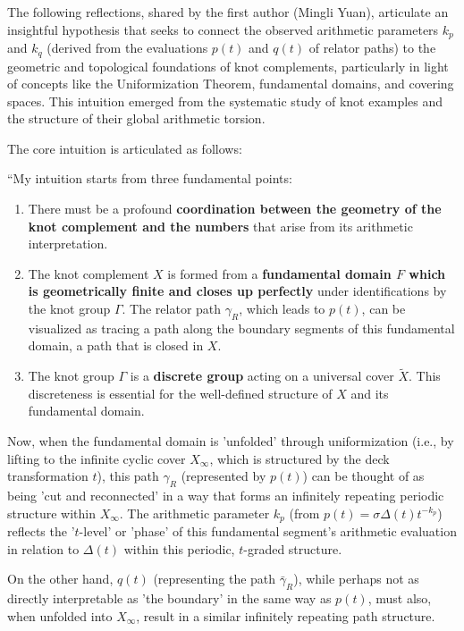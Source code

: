 \documentclass{article}[a4paper,12pt]
\begin{document}
The following reflections, shared by the first author (Mingli Yuan), articulate an insightful hypothesis that seeks to connect the observed arithmetic parameters $k_p$ and $k_q$ (derived from the evaluations $p(t)$ and $q(t)$ of relator paths) to the geometric and topological foundations of knot complements, particularly in light of concepts like the Uniformization Theorem, fundamental domains, and covering spaces. This intuition emerged from the systematic study of knot examples and the structure of their global arithmetic torsion.

The core intuition is articulated as follows:

``My intuition starts from three fundamental points:
\begin{enumerate}
    \item There must be a profound \textbf{coordination between the geometry of the knot complement and the numbers} that arise from its arithmetic interpretation.
    \item The knot complement $X$ is formed from a \textbf{fundamental domain $F$ which is geometrically finite and closes up perfectly} under identifications by the knot group $\Gamma$. The relator path $\gamma_R$, which leads to $p(t)$, can be visualized as tracing a path along the boundary segments of this fundamental domain, a path that is closed in $X$.
    \item The knot group $\Gamma$ is a \textbf{discrete group} acting on a universal cover $\tilde{X}$. This discreteness is essential for the well-defined structure of $X$ and its fundamental domain.
\end{enumerate}

Now, when the fundamental domain is 'unfolded' through uniformization (i.e., by lifting to the infinite cyclic cover $X_\infty$, which is structured by the deck transformation $t$), this path $\gamma_R$ (represented by $p(t)$) can be thought of as being 'cut and reconnected' in a way that forms an infinitely repeating periodic structure within $X_\infty$. The arithmetic parameter $k_p$ (from $p(t) = \sigma \Delta(t)t^{-k_p}$) reflects the '$t$-level' or 'phase' of this fundamental segment's arithmetic evaluation in relation to $\Delta(t)$ within this periodic, $t$-graded structure.

On the other hand, $q(t)$ (representing the path $\bar{\gamma}_R$), while perhaps not as directly interpretable as 'the boundary' in the same way as $p(t)$, must also, when unfolded into $X_\infty$, result in a similar infinitely repeating path structure.
\end{document}
